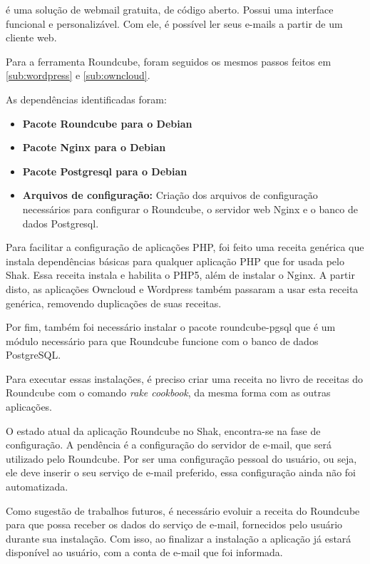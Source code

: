  é uma solução de webmail gratuita, de código 
aberto. Possui uma interface funcional e personalizável. Com ele, é possível
ler seus e-mails a partir de um cliente web. 

Para a ferramenta Roundcube, foram seguidos os mesmos passos feitos em 
\ref{sub:wordpress} e \ref{sub:owncloud}.

As dependências identificadas foram:

\begin{itemize}
   \item \textbf{Pacote Roundcube para o Debian}
   \item \textbf{Pacote Nginx para o Debian}
   \item \textbf{Pacote Postgresql para o Debian}
   \item \textbf{Arquivos de configuração:} Criação dos arquivos de configuração
   necessários para configurar o Roundcube, o servidor web Nginx e o banco de dados
   Postgresql.
\end{itemize}

Para facilitar a configuração de aplicações PHP, foi feito uma receita genérica
que instala dependências básicas para qualquer aplicação PHP que for usada pelo
Shak. Essa receita instala e habilita o PHP5, além de instalar o Nginx. A partir
disto, as aplicações Owncloud e Wordpress também passaram a usar esta receita
genérica, removendo duplicações de suas receitas.

Por fim, também foi necessário instalar o pacote roundcube-pgsql que é um módulo 
necessário para que Roundcube funcione com o banco de dados PostgreSQL.
 
Para executar essas instalações, é preciso criar uma receita no livro de receitas
do Roundcube com o comando \textit{rake cookbook}, da mesma forma com as outras aplicações.
 
O estado atual da aplicação Roundcube no Shak, encontra-se na fase de configuração. A pendência 
é a configuração do servidor de e-mail, que será utilizado pelo Roundcube. Por ser
uma configuração pessoal do usuário, ou seja, ele deve inserir o seu serviço
de e-mail preferido, essa configuração ainda não foi automatizada. 

Como sugestão de trabalhos futuros, é necessário evoluir a receita do Roundcube 
para que possa receber os dados do serviço de e-mail, fornecidos pelo usuário 
durante sua instalação. Com isso, ao finalizar a instalação a aplicação já 
estará disponível ao usuário, com a conta de e-mail que foi informada.

